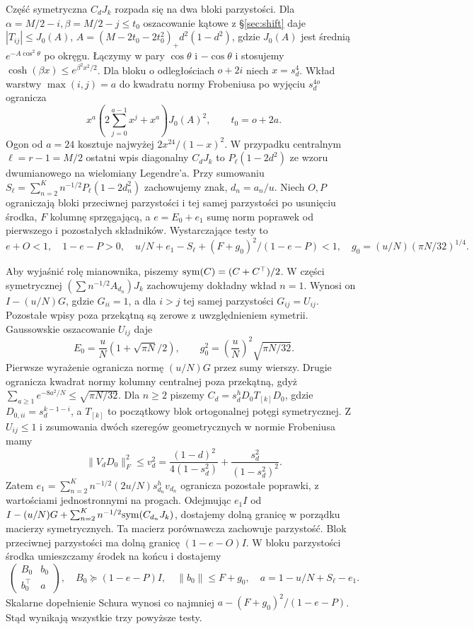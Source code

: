 \documentclass[11pt,a4paper,reqno]{amsart}
\numberwithin{equation}{section}
\begin{document}
Część symetryczna \(C_dJ_k\) rozpada się na dwa bloki parzystości. Dla \(\alpha=M/2-i,\beta=M/2-j\le t_0\) oszacowanie kątowe z \S\ref{sec:shift} daje \(|T_{ij}|\le J_0(A)\), \(A=(M-2t_0-2t_0^2)_+d^2(1-d^2)\), gdzie \(J_0(A)\) jest średnią \(e^{-A\cos^2\theta}\) po okręgu. Łączymy w pary \(\cos\theta\) i \(-\cos\theta\) i stosujemy \(\cosh(\beta x)\le e^{\beta^2x^2/2}\). Dla bloku o odległościach \(o+2i\) niech \(x=s_d^4\). Wkład warstwy \(\max(i,j)=a\) do kwadratu normy Frobeniusa po wyjęciu \(s_d^{4o}\) ogranicza \[x^a\left(2\sum_{j=0}^{a-1}x^j+x^a\right)J_0(A)^2,\qquad t_0=o+2a.\] Ogon od \(a=24\) kosztuje najwyżej \(2x^{24}/(1-x)^2\). W przypadku centralnym \(\ell=r-1=M/2\) ostatni wpis diagonalny \(C_dJ_k\) to \(P_\ell(1-2d^2)\) ze wzoru dwumianowego na wielomiany Legendre'a. Przy sumowaniu \(S_\ell=\sum_{n=2}^K n^{-1/2}P_\ell(1-2d_n^2)\) zachowujemy znak, \(d_n=a_n/u\). Niech \(O,P\) ograniczają bloki przeciwnej parzystości i tej samej parzystości po usunięciu środka, \(F\) kolumnę sprzęgającą, a \(e=E_0+e_1\) sumę norm poprawek od pierwszego i pozostałych składników. Wystarczające testy to \[e+O<1,\quad 1-e-P>0,\quad
u/N+e_1-S_\ell+(F+g_0)^2/(1-e-P)<1,\quad g_0=(u/N)(\pi N/32)^{1/4}.\]

Aby wyjaśnić rolę mianownika, piszemy \({\rm sym}(C)=(C+C^\top)/2\). W części symetrycznej \((\sum n^{-1/2}A_{d_n})J_k\) zachowujemy dokładny wkład \(n=1\). Wynosi on \(I-(u/N)G\), gdzie \(G_{ii}=1\), a dla \(i>j\) tej samej parzystości \(G_{ij}=U_{ij}\). Pozostałe wpisy poza przekątną są zerowe z uwzględnieniem symetrii. Gaussowskie oszacowanie \(U_{ij}\) daje
\[
 E_0=\frac{u}{N}(1+\sqrt{\pi N}/2),\qquad
 g_0^2=\left(\frac{u}{N}\right)^2\sqrt{\pi N/32}.
\]
Pierwsze wyrażenie ogranicza normę \((u/N)G\) przez sumy wierszy. Drugie ogranicza kwadrat normy kolumny centralnej poza przekątną, gdyż \(\sum_{a\ge1}e^{-8a^2/N}\le\sqrt{\pi N/32}\). Dla \(n\ge2\) piszemy \(C_d=s_d^hD_0 T_{[k]}D_0\), gdzie \(D_{0,ii}=s_d^{k-1-i}\), a \(T_{[k]}\) to początkowy blok ortogonalnej potęgi symetrycznej. Z \(U_{ij}\le1\) i zsumowania dwóch szeregów geometrycznych w normie Frobeniusa mamy
\[
 \|V_dD_0\|_F^2\le v_d^2
 =\frac{(1-d)^2}{4(1-s_d^2)}+\frac{s_d^2}{(1-s_d^2)^2}.
\]
Zatem \(e_1=\sum_{n=2}^K n^{-1/2}(2u/N)s_{d_n}^h v_{d_n}\) ogranicza pozostałe poprawki, z wartościami jednostronnymi na progach. Odejmując \(e_1 I\) od \(I-(u/N)G+\sum_{n=2}^K n^{-1/2}{\rm sym}(C_{d_n}J_k)\), dostajemy dolną granicę w porządku macierzy symetrycznych. Ta macierz porównawcza zachowuje parzystość. Blok przeciwnej parzystości ma dolną granicę \((1-e-O)I\). W bloku parzystości środka umieszczamy środek na końcu i dostajemy
\[
 \begin{pmatrix} B_0&b_0\\ b_0^\top&a\end{pmatrix},\quad
 B_0\succeq(1-e-P)I,\quad\|b_0\|\le F+g_0,\quad
 a=1-u/N+S_\ell-e_1 .
\]
Skalarne dopełnienie Schura wynosi co najmniej \(a-(F+g_0)^2/(1-e-P)\). Stąd wynikają wszystkie trzy powyższe testy.
\end{document}
